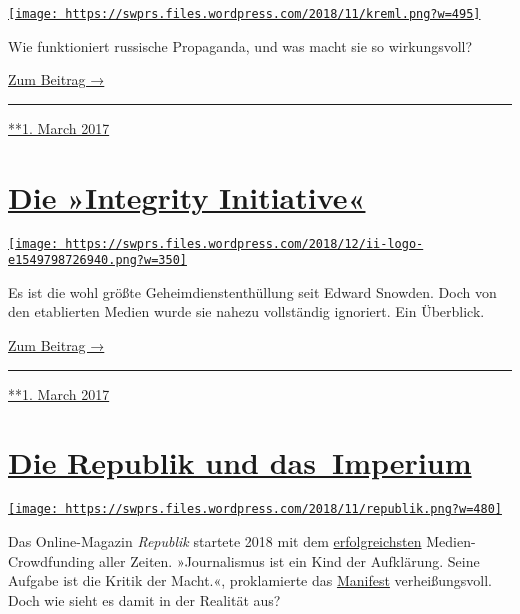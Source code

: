\href{https://swprs.org/2017/03/01/russische-propaganda/}{\texttt{[image: https://swprs.files.wordpress.com/2018/11/kreml.png?w=495]}}

Wie funktioniert russische Propaganda, und was macht sie so
wirkungs­voll?

\href{https://swprs.org/russische-propaganda/}{Zum Beitrag →}

\begin{center}\rule{0.5\linewidth}{\linethickness}\end{center}

\href{https://swprs.org/2017/03/01/russische-propaganda/}{**1. March
2017}

\hypertarget{die-integrity-initiative}{%
\section{\texorpdfstring{\href{https://swprs.org/2017/03/01/die-integrity-initiative/}{Die
»Integrity
Initiative«}}{Die »Integrity Initiative«}}\label{die-integrity-initiative}}

\href{https://swprs.org/2017/03/01/die-integrity-initiative/}{\texttt{[image: https://swprs.files.wordpress.com/2018/12/ii-logo-e1549798726940.png?w=350]}}

Es ist die wohl größte Geheimdienstenthüllung seit Edward Snowden. Doch
von den etablierten Medien wurde sie nahezu vollständig ignoriert. Ein
Überblick.

\href{https://swprs.org/die-integrity-initiative/}{Zum Beitrag →}

\begin{center}\rule{0.5\linewidth}{\linethickness}\end{center}

\href{https://swprs.org/2017/03/01/die-integrity-initiative/}{**1. March
2017}

\hypertarget{die-republik-und-das-imperium}{%
\section{\texorpdfstring{\href{https://swprs.org/2017/03/01/die-republik-und-das-imperium/}{Die
Republik und
das~Imperium}}{Die Republik und das~Imperium}}\label{die-republik-und-das-imperium}}

\href{https://swprs.org/2017/03/01/die-republik-und-das-imperium/}{\texttt{[image: https://swprs.files.wordpress.com/2018/11/republik.png?w=480]}}

Das Online-Magazin \emph{Republik} startete 2018 mit dem
\href{https://www.persoenlich.com/medien/weltrekord-fur-journalistisches-crowdfunding-gebrochen}{erfolgreichsten}
Medien-Crowdfunding aller Zeiten. »Journalismus ist ein Kind der
Aufklä­rung. Seine Aufgabe ist die Kritik der Macht.«, proklamierte das
\href{https://www.republik.ch/manifest}{Manifest} verheißungsvoll. Doch
wie sieht es damit in der Realität aus?

